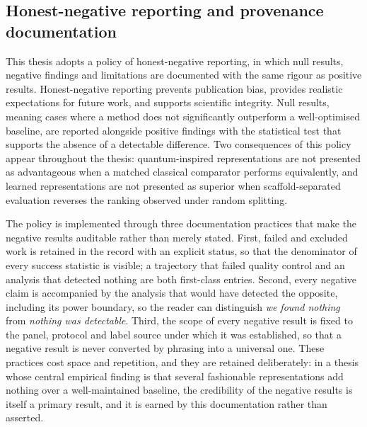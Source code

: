 \subsection{Honest-negative reporting and provenance documentation}

This thesis adopts a policy of honest-negative reporting, in which null results, negative findings and limitations are documented with the same rigour as positive results. Honest-negative reporting prevents publication bias, provides realistic expectations for future work, and supports scientific integrity. Null results, meaning cases where a method does not significantly outperform a well-optimised baseline, are reported alongside positive findings with the statistical test that supports the absence of a detectable difference. Two consequences of this policy appear throughout the thesis: quantum-inspired representations are not presented as advantageous when a matched classical comparator performs equivalently, and learned representations are not presented as superior when scaffold-separated evaluation reverses the ranking observed under random splitting.

The policy is implemented through three documentation practices that make the negative results auditable rather than merely stated. First, failed and excluded work is retained in the record with an explicit status, so that the denominator of every success statistic is visible; a trajectory that failed quality control and an analysis that detected nothing are both first-class entries. Second, every negative claim is accompanied by the analysis that would have detected the opposite, including its power boundary, so the reader can distinguish \emph{we found nothing} from \emph{nothing was detectable}. Third, the scope of every negative result is fixed to the panel, protocol and label source under which it was established, so that a negative result is never converted by phrasing into a universal one. These practices cost space and repetition, and they are retained deliberately: in a thesis whose central empirical finding is that several fashionable representations add nothing over a well-maintained baseline, the credibility of the negative results is itself a primary result, and it is earned by this documentation rather than asserted.

